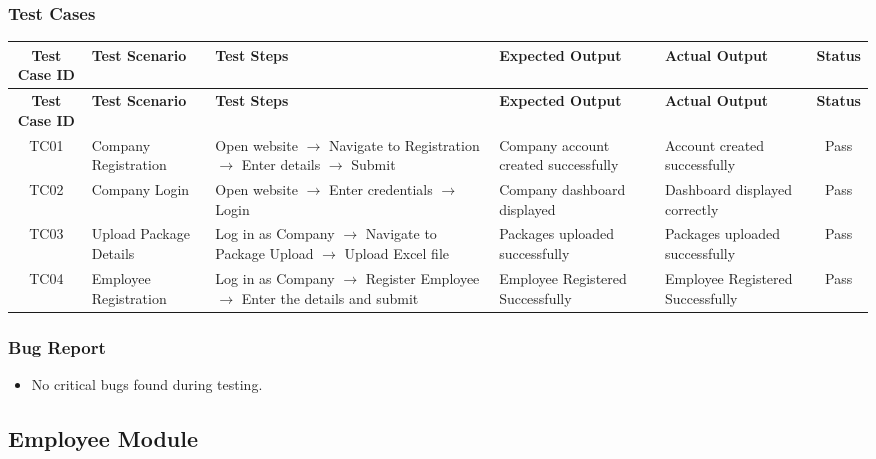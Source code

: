 \documentclass{article}
\begin{document}
\subsubsection{Test Cases}
\small
\setlength\LTleft{0pt}
\setlength\LTright{0pt}
\begin{longtable}{|c|p{2.8cm}|p{4cm}|p{2.8cm}|p{2.8cm}|c|}
\hline
\textbf{Test Case ID} & \textbf{Test Scenario} & \textbf{Test Steps} & \textbf{Expected Output} & \textbf{Actual Output} & \textbf{Status} \\
\hline
\endfirsthead
\hline
\textbf{Test Case ID} & \textbf{Test Scenario} & \textbf{Test Steps} & \textbf{Expected Output} & \textbf{Actual Output} & \textbf{Status} \\
\hline
\endhead
TC01 & Company Registration & Open website $\rightarrow$ Navigate to Registration $\rightarrow$ Enter details $\rightarrow$ Submit & Company account created successfully & Account created successfully & Pass \\
\hline
TC02 & Company Login & Open website $\rightarrow$ Enter credentials $\rightarrow$ Login & Company dashboard displayed & Dashboard displayed correctly & Pass \\
\hline
TC03 & Upload Package Details & Log in as Company $\rightarrow$ Navigate to Package Upload $\rightarrow$ Upload Excel file & Packages uploaded successfully & Packages uploaded successfully & Pass \\
\hline
TC04 & Employee Registration & Log in as Company $\rightarrow$ Register Employee $\rightarrow$ Enter the details and submit & Employee Registered Successfully & Employee Registered Successfully & Pass 
\\
\hline
\end{longtable}

\subsubsection{Bug Report}
\begin{itemize}
    \item No critical bugs found during testing.
\end{itemize}

\newpage

\subsection{Employee Module}
\end{document}
